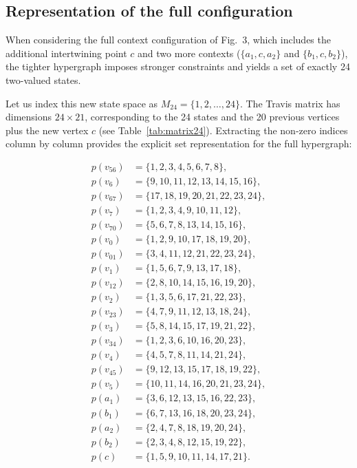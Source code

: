 \documentclass[
  twocolumn,
  aps,
  pra,
  floatfix,
  amsmath,amssymb,
  longbibliography
]{revtex4-2}
\theoremstyle{definition}
\theoremstyle{remark}
\begin{document}
\subsection{Representation of the full configuration}
\label{app:set_representation-full}


When considering the full context configuration of Fig.~3, which includes the additional intertwining point $c$ and two more contexts ($\{a_1, c, a_2\}$ and $\{b_1, c, b_2\}$), the tighter hypergraph imposes stronger constraints and yields a set of exactly 24 two-valued states.

Let us index this new state space as $M_{24} = \{1, 2, \dots, 24\}$.
The Travis matrix has dimensions $24 \times 21$, corresponding to the 24 states and the 20 previous vertices plus the new vertex $c$ (see Table~\ref{tab:matrix24}).
Extracting the non-zero indices column by column provides the explicit set representation for the full hypergraph:

\begin{align*}
p(v_{56}) &= \{1, 2, 3, 4, 5, 6, 7, 8\}, \\
p(v_{6})  &= \{9, 10, 11, 12, 13, 14, 15, 16\}, \\
p(v_{67}) &= \{17, 18, 19, 20, 21, 22, 23, 24\}, \\
p(v_{7})  &= \{1, 2, 3, 4, 9, 10, 11, 12\}, \\
p(v_{70}) &= \{5, 6, 7, 8, 13, 14, 15, 16\}, \\
p(v_{0})  &= \{1, 2, 9, 10, 17, 18, 19, 20\}, \\
p(v_{01}) &= \{3, 4, 11, 12, 21, 22, 23, 24\}, \\
p(v_{1})  &= \{1, 5, 6, 7, 9, 13, 17, 18\}, \\
p(v_{12}) &= \{2, 8, 10, 14, 15, 16, 19, 20\}, \\
p(v_{2})  &= \{1, 3, 5, 6, 17, 21, 22, 23\}, \\
p(v_{23}) &= \{4, 7, 9, 11, 12, 13, 18, 24\}, \\
p(v_{3})  &= \{5, 8, 14, 15, 17, 19, 21, 22\}, \\
p(v_{34}) &= \{1, 2, 3, 6, 10, 16, 20, 23\}, \\
p(v_{4})  &= \{4, 5, 7, 8, 11, 14, 21, 24\}, \\
p(v_{45}) &= \{9, 12, 13, 15, 17, 18, 19, 22\}, \\
p(v_{5})  &= \{10, 11, 14, 16, 20, 21, 23, 24\}, \\[1ex]
p(a_{1})  &= \{3, 6, 12, 13, 15, 16, 22, 23\}, \\
p(b_{1})  &= \{6, 7, 13, 16, 18, 20, 23, 24\}, \\
p(a_{2})  &= \{2, 4, 7, 8, 18, 19, 20, 24\}, \\
p(b_{2})  &= \{2, 3, 4, 8, 12, 15, 19, 22\}, \\[1ex]
p(c)      &= \{1, 5, 9, 10, 11, 14, 17, 21\}.
\end{align*}
\end{document}
